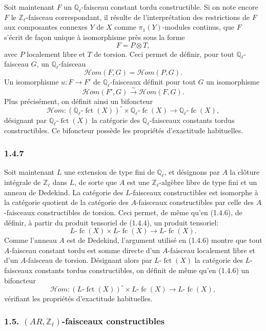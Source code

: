\documentclass[11pt]{article}
\providecommand{\fct}{\operatorname{fct}}
\providecommand{\cHom}{\mathcal{H}om}
\providecommand{\fc}{\operatorname{fc}}
\begin{document}
Soit maintenant \(F\) un \(\mathbb Q_\ell\)-faisceau constant tordu constructible. Si on note encore \(F\) le \(\mathbb Z_\ell\)-faisceau correspondant, il résulte de l'interprétation des restrictions de \(F\) aux composantes connexes \(Y\) de \(X\) comme \(\pi_1(Y)\)-modules continus, que \(F\) s'écrit de façon unique à isomorphisme près sous la forme
\[
F=P\otimes T,
\]
avec \(P\) localement libre et \(T\) de torsion. Ceci permet de définir, pour tout \(\mathbb Q_\ell\)-faisceau \(G\), un \(\mathbb Q_\ell\)-faisceau
\[
\cHom(F,G)=\cHom(P,G).
\]
Un isomorphisme \(u:F\to F'\) de \(\mathbb Q_\ell\)-faisceaux définit pour tout \(G\) un isomorphisme
\[
\cHom(F',G)\xrightarrow{\sim}\cHom(F,G).
\]
Plus précisément, on définit ainsi un bifoncteur
\[
\cHom:(\mathbb Q_\ell\text{-}\fct(X))^\circ\times \mathbb Q_\ell\text{-}\fc(X)
\longrightarrow \mathbb Q_\ell\text{-}\fc(X),
\]
désignant par \(\mathbb Q_\ell\text{-}\fct(X)\) la catégorie des \(\mathbb Q_\ell\)-faisceaux constants tordus constructibles. Ce bifoncteur possède les propriétés d'exactitude habituelles.

\subsubsection*{1.4.7}
Soit maintenant \(L\) une extension de type fini de \(\mathbb Q_\ell\), et désignons par \(A\) la clôture intégrale de \(\mathbb Z_\ell\) dans \(L\), de sorte que \(A\) est une \(\mathbb Z_\ell\)-algèbre libre de type fini et un anneau de Dedekind. La catégorie des \(L\)-faisceaux constructibles est isomorphe à la catégorie quotient de la catégorie des \(A\)-faisceaux constructibles par celle des \(A\)-faisceaux constructibles de torsion. Ceci permet, de même qu'en (1.4.6), de définir, à partir du produit tensoriel de (1.4.4), un produit tensoriel:
\[
L\text{-}\fc(X)\times L\text{-}\fc(X)\longrightarrow L\text{-}\fc(X).
\]
Comme l'anneau \(A\) est de Dedekind, l'argument utilisé en (1.4.6) montre que tout \(A\)-faisceau constant tordu est somme directe d'un \(A\)-faisceau localement libre et d'un \(A\)-faisceau de torsion. Désignant alors par \(L\text{-}\fct(X)\) la catégorie des \(L\)-faisceaux constants tordus constructibles, on définit de même qu'en (1.4.6) un bifoncteur
\[
\cHom:(L\text{-}\fct(X))^\circ\times L\text{-}\fc(X)
\longrightarrow L\text{-}\fc(X),
\]
vérifiant les propriétés d'exactitude habituelles.

\subsubsection*{1.5. \((AR,\mathbb Z_\ell)\)-faisceaux constructibles}
\end{document}
